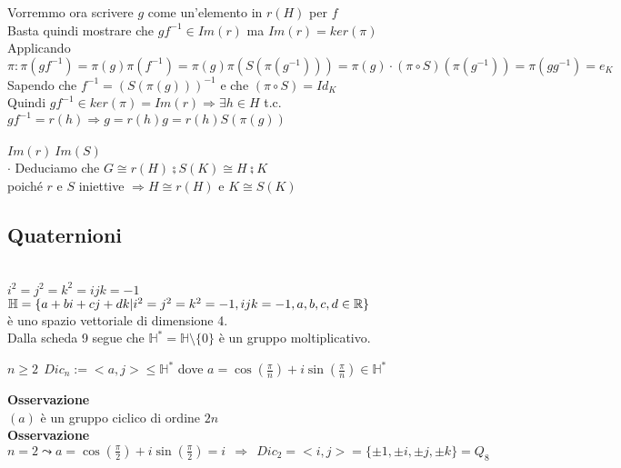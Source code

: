 \documentclass[12px]{article}
\begin{document}
{	 Vorremmo ora scrivere $g$ come un'elemento in $r(H)$ per $f$\\
	 Basta quindi mostrare che  $gf^{-1}\in Im(r)$ ma  $Im(r) = ker(\pi)$\\
	 Applicando  $\pi: \pi(gf^{-1}) = \pi(g)\pi(f^{-1}) = \pi(g)\pi(S(\pi(g^{-1}))) = \pi(g)\cdot(\pi\circ S)(\pi(g^{-1}))= \pi(gg^{-1}) = e_K$\\
	 Sapendo che  $f^{-1} = (S(\pi(g)))^{-1}$ e che $(\pi\circ S) = Id_K$\\
	 Quindi  $gf^{-1}\in ker(\pi) = Im(r) \Rightarrow \exists h\in H$ t.c. $gf^{-1} = r(h) \Rightarrow g = r(h)g = r(h)S(\pi(g))$ \\
	 \text{ }\storto \ni \ \ \ \ \ \storto\ni\\
	 $Im(r) \  Im(S)$ \\
	 $\cdot$ Deduciamo che $G\cong r(H)\semi S(K)\cong H\semi K$\\
	 poiché  $r$ e $S$  iniettive $ \Rightarrow H\cong r(H)$ e $ K\cong S(K)$
	 \subsection{Quaternioni}\\
	 $i^2 = j^2 = k^2 = ijk = -1$\\
	 $\mathbb H = \{a + bi + cj + dk | i^2 = j^2 = k^2 = -1, ijk = -1, a,b,c,d\in \mathbb{R}\}$\\
	 è uno spazio vettoriale di dimensione 4. \\
	 Dalla scheda 9 segue che  $\mathbb H^* = \mathbb H\setminus\{0\}$ è un gruppo moltiplicativo.\\
	 \begin{defi}
	 	$n\geq 2 \ \ Dic_n:= <a,j> \leq \mathbb H^*$ dove  $a = \cos(\frac \pi n) + i\sin(\frac \pi n)\in \mathbb H^*$
	 \end{defi}
	 \textbf{Osservazione}\\
	 $(a)$ è un gruppo ciclico di ordine $2n$\\
	  \textbf{Osservazione}\\
	  $n = 2 \leadsto a = \cos(\frac \pi 2 ) + i \sin (\frac \pi 2) = i \ \ \Rightarrow  \ \ Dic_2 = <i,j> = \{\pm 1,\pm i, \pm j,\pm k\} = Q_8$ \\
}
\end{document}
